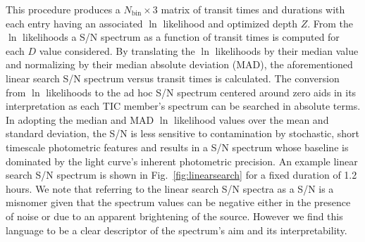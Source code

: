 This procedure produces a $N_{\text{bin}} \times 3$ matrix of transit times and durations
with each entry having an associated $\ln$ likelihood and optimized depth $Z$.
From the $\ln$ likelihoods a S/N spectrum as a function of transit times
is computed for each $D$ value considered. By translating the $\ln$ likelihoods by
their median value and normalizing by their median absolute deviation (MAD),
the aforementioned linear search S/N spectrum versus transit times is calculated.
The conversion from
$\ln$ likelihoods to the ad hoc S/N spectrum centered around zero aids in its interpretation as
each TIC member's spectrum can be searched in absolute terms.
In adopting the median and MAD $\ln$ likelihood values over the mean and standard deviation, the S/N
is less sensitive to contamination by stochastic, short timescale photometric features
and results in a S/N spectrum whose baseline  is dominated by the light curve's
inherent photometric precision. An example linear search S/N spectrum is shown in
Fig.~\ref{fig:linearsearch} for a fixed duration of 1.2 hours. We note that referring to the
linear search S/N spectra as a S/N is a misnomer given that the spectrum values can be negative
either in the presence of noise or due to an apparent brightening of the source.
However we find this language to be a clear descriptor of the spectrum's aim and its
interpretability. \\

